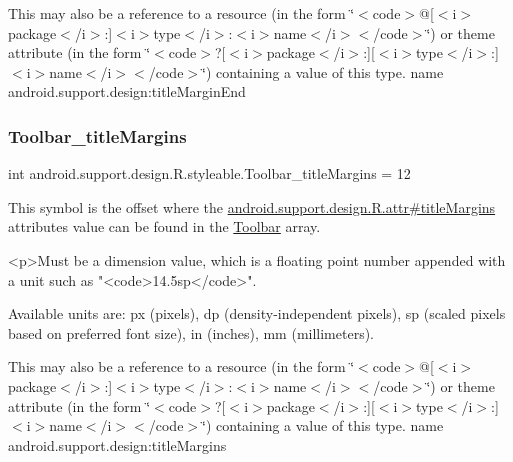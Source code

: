 This may also be a reference to a resource (in the form \char`\"{}$<$code$>$@\mbox{[}$<$i$>$package$<$/i$>$\+:\mbox{]}$<$i$>$type$<$/i$>$\+:$<$i$>$name$<$/i$>$$<$/code$>$\char`\"{}) or theme attribute (in the form \char`\"{}$<$code$>$?\mbox{[}$<$i$>$package$<$/i$>$\+:\mbox{]}\mbox{[}$<$i$>$type$<$/i$>$\+:\mbox{]}$<$i$>$name$<$/i$>$$<$/code$>$\char`\"{}) containing a value of this type.  name android.\+support.\+design\+:title\+Margin\+End \mbox{\label{classandroid_1_1support_1_1design_1_1R_1_1styleable_ae49b23069bb886262bf59ab027045954}} 
\subsubsection{\texorpdfstring{Toolbar\+\_\+title\+Margins}{Toolbar\_titleMargins}}
{\footnotesize\ttfamily int android.\+support.\+design.\+R.\+styleable.\+Toolbar\+\_\+title\+Margins = 12\hspace{0.3cm}{\ttfamily [static]}}

This symbol is the offset where the \hyperlink{classandroid_1_1support_1_1design_1_1R_1_1attr_a62098fcd5729333af2c4347b968ab03a}{android.\+support.\+design.\+R.\+attr\#title\+Margins} attribute\textquotesingle{}s value can be found in the \hyperlink{classandroid_1_1support_1_1design_1_1R_1_1styleable_a7783ebe780dbe2a845802a40519a46e9}{Toolbar} array.

\begin{DoxyVerb}      <p>Must be a dimension value, which is a floating point number appended with a unit such as "<code>14.5sp</code>".
\end{DoxyVerb}
 Available units are\+: px (pixels), dp (density-\/independent pixels), sp (scaled pixels based on preferred font size), in (inches), mm (millimeters). 

This may also be a reference to a resource (in the form \char`\"{}$<$code$>$@\mbox{[}$<$i$>$package$<$/i$>$\+:\mbox{]}$<$i$>$type$<$/i$>$\+:$<$i$>$name$<$/i$>$$<$/code$>$\char`\"{}) or theme attribute (in the form \char`\"{}$<$code$>$?\mbox{[}$<$i$>$package$<$/i$>$\+:\mbox{]}\mbox{[}$<$i$>$type$<$/i$>$\+:\mbox{]}$<$i$>$name$<$/i$>$$<$/code$>$\char`\"{}) containing a value of this type.  name android.\+support.\+design\+:title\+Margins \mbox{\label{classandroid_1_1support_1_1design_1_1R_1_1styleable_ad039c0dbf8952631ed1ef085c60c5c16}} 
